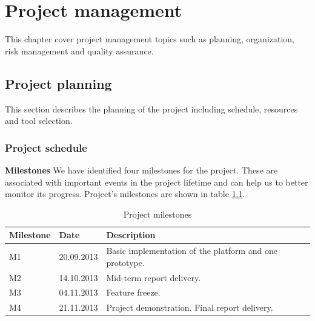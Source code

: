 \chapter{Project management}

\label{ch:management}
\nocite{Sommerville9}

This chapter cover project management topics such as planning, organization, risk management and quality assurance.

\section{Project planning}
\label{section:planning}
This section describes the planning of the project including schedule, resources and tool selection.

\subsection{Project schedule}
\label{section:schedule}

\textbf{Milestones} \newline
We have identified four milestones for the project. These are associated with important events in the project lifetime
and can help us to better monitor its progress. Project's milestones are shown in table \ref{table:milestones}.

\begin{table}[h]
\begin{center}
\begin{tabular}{ | l | l | l | }
  \hline
  Milestone & Date & Description \\
  \hline\noalign{\smallskip}\hline
  M1 & 20.09.2013 & Basic implementation of the platform and one prototype. \\ 
  M2 & 14.10.2013 & Mid-term report delivery. \\
  M3 & 04.11.2013 & Feature freeze. \\
  M4 & 21.11.2013 & Project demonstration. Final report delivery. \\
  \hline
\end{tabular}
\end{center}
\caption{Project milestones}
\label{table:milestones}
\end{table}

